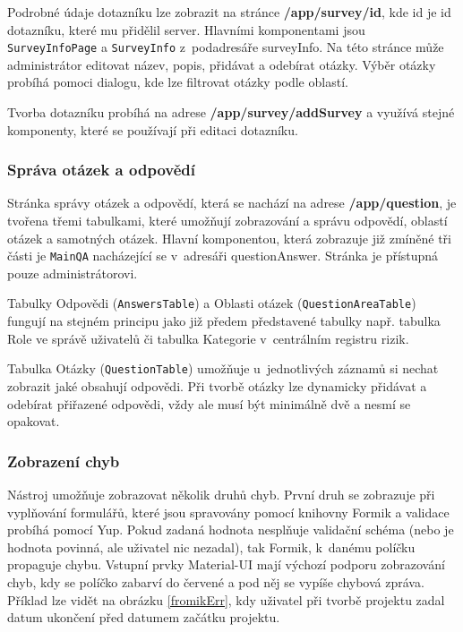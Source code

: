Podrobné údaje dotazníku lze zobrazit na stránce \textbf{/app/survey/id}, kde id je id dotazníku, které mu přidělil server. Hlavními komponentami jsou \texttt{SurveyInfoPage} a \texttt{SurveyInfo} z~podadresáře surveyInfo. Na této stránce může administrátor editovat název, popis, přidávat a odebírat otázky. Výběr otázky probíhá pomoci dialogu, kde lze filtrovat otázky podle oblastí.

Tvorba dotazníku probíhá na adrese \textbf{/app/survey/addSurvey} a využívá stejné komponenty, které se používají při editaci dotazníku. 


\subsubsection *{Správa otázek a odpovědí}

Stránka správy otázek a odpovědí, která se nachází na adrese \textbf{/app/question}, je tvořena třemi tabulkami, které umožňují zobrazování a správu odpovědí, oblastí otázek a samotných otázek. Hlavní komponentou, která zobrazuje již zmíněné tři části je \texttt{MainQA} nacházející se v~adresáři questionAnswer. Stránka je přístupná pouze administrátorovi. 

Tabulky Odpovědi (\texttt{AnswersTable}) a Oblasti otázek (\texttt{QuestionAreaTable}) fungují na stejném principu jako již předem představené tabulky např. tabulka Role ve správě uživatelů či tabulka Kategorie v~centrálním registru rizik.

Tabulka Otázky (\texttt{QuestionTable}) umožňuje u~jednotlivých záznamů si nechat zobrazit jaké obsahují odpovědi. Při tvorbě otázky lze dynamicky přidávat a odebírat přiřazené odpovědi, vždy ale musí být minimálně dvě a nesmí se opakovat.


\subsubsection *{Zobrazení chyb}

Nástroj umožňuje zobrazovat několik druhů chyb. První druh se zobrazuje při vyplňování formulářů, které jsou spravovány pomocí knihovny Formik a validace probíhá pomocí Yup. Pokud zadaná hodnota nesplňuje validační schéma (nebo je hodnota povinná, ale uživatel nic nezadal), tak Formik, k~danému políčku propaguje chybu. Vstupní prvky Material-UI mají výchozí podporu zobrazování chyb, kdy se políčko zabarví do červené a pod něj se vypíše chybová zpráva. Příklad lze vidět na obrázku \ref{fromikErr}, kdy uživatel při tvorbě projektu zadal datum ukončení před datumem začátku projektu.

